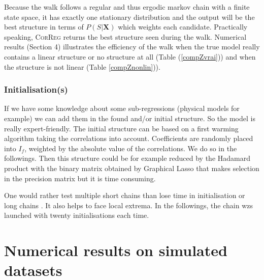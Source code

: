 \documentclass[11pt,a4paper]{article}
\begin{document}
Because the walk follows a regular and thus ergodic markov chain with a finite state space, it has exactly one stationary distribution \cite{grinstead1997introduction} %
%	
%	
%		
and the output will be the best structure in terms of $P(S|\boldsymbol{X})$ which weights each candidate. Practically speaking, \textsc{CorReg} returns the best structure seen during the walk.
Numerical results (Section 4) illustrates the efficiency of the walk when the true model really contains a linear structure or no structure at all (Table (\ref{compZvrai})) and when the structure is not linear (Table \ref{compZnonlin})).

 \subsubsection{Initialisation(s)}
 If we have some knowledge about some sub-regressions (physical models for example) we can add them in the found and/or initial structure. So the model is really expert-friendly.
The initial structure can be based on a first warming algorithm taking the correlations into account. Coefficients are randomly placed into $I_f$, weighted by the absolute value of the correlations. We do so in the followings. Then this structure could be for example reduced by the Hadamard product with the binary matrix obtained by Graphical Lasso\cite{friedman2008sparse} that makes selection in the precision matrix but it is time consuming.

	One would rather test multiple short chains than lose time in initialisation or long chains \cite{gilks1996markov}. It also helps to face local extrema. In the followings, the chain wzs launched with twenty initialisations each time.
	
\section{Numerical results on simulated datasets} \label{sectionsimul}
\end{document}
